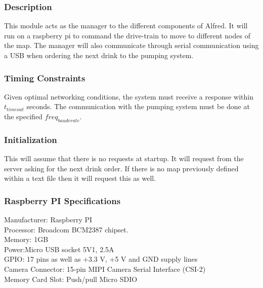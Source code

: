 \documentclass [10pt]{article}
\begin{document}

\subsubsection{Description}
This module acts as the manager to the different components of Alfred. It will run on a raspberry pi to command the drive-train to move to different nodes of the map. The manager will also communicate through serial communication using a USB when ordering the next drink to the pumping system.


\subsubsection{Timing Constraints}
Given optimal networking conditions, the system must receive a response within  $ t_{timeout} $ seconds. The communication with the pumping system must be done at the specified $freq_{bauderate}$.


\subsubsection{Initialization}
This will assume that there is no requests at startup. It will request from the server asking for the next drink order. If there is no map previously defined within a text file then it will request this as well.



\subsubsection{Raspberry PI Specifications}
Manufacturer: Raspberry PI \\
Processor: Broadcom BCM2387 chipset. \\
Memory: 1GB \\
Power:Micro USB socket 5V1, 2.5A\\
GPIO: 17 pins as well as +3.3 V, +5 V and GND supply lines\\
Camera Connector: 15-pin MIPI Camera Serial Interface (CSI-2)\\
Memory Card Slot: Push/pull Micro SDIO\\
\end{document}
